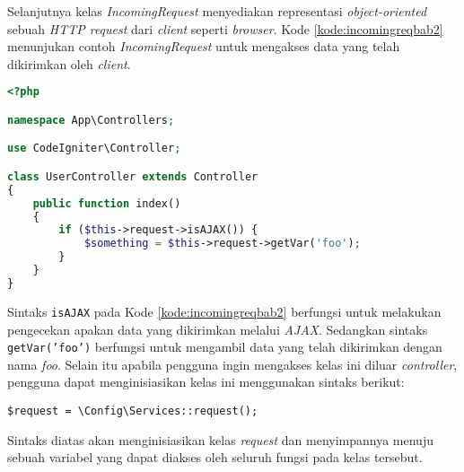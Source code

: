 Selanjutnya kelas \textit{IncomingRequest} menyediakan representasi \textit{object-oriented} sebuah \textit{HTTP request} dari \textit{client} seperti \textit{browser}. Kode \ref{kode:incomingreqbab2} menunjukan contoh \textit{IncomingRequest} untuk mengakses data yang telah dikirimkan oleh \textit{client}.
\begin{lstlisting}[language=PHP, caption=Contoh mengakses data menggunakan \textit{IncomingRequest},label=kode:incomingreqbab2]
<?php

namespace App\Controllers;

use CodeIgniter\Controller;

class UserController extends Controller
{
    public function index()
    {
        if ($this->request->isAJAX()) {
            $something = $this->request->getVar('foo');
        }
    }
}
\end{lstlisting}
Sintaks \texttt{isAJAX} pada Kode \ref{kode:incomingreqbab2} berfungsi untuk melakukan pengecekan apakan data yang dikirimkan melalui \textit{AJAX}. Sedangkan sintaks \texttt{getVar('foo')} berfungsi untuk mengambil data yang telah dikirimkan dengan nama \textit{foo}. Selain itu apabila pengguna ingin mengakses kelas ini diluar \textit{controller}, pengguna dapat menginisiasikan kelas ini menggunakan sintaks berikut:
\begin{center}
	\verb|$request = \Config\Services::request();|
\end{center}
Sintaks diatas akan menginisiasikan kelas \textit{request} dan menyimpannya menuju sebuah variabel yang dapat diakses oleh seluruh fungsi pada kelas tersebut.
